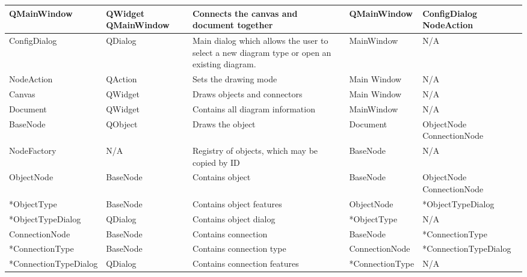 \documentclass[twoside,letterpaper]{article}
\begin{document}
{\begin{landscape}
\begin{flushleft}
\begin{supertabular}{|m{1.65in}|m{1.0in}|m{3.0in}|m{1.65in}|m{1.65in}|}
    QMainWindow 
  & QWidget \newline QMainWindow 
  & Connects the canvas and document together 
  & QMainWindow
  & ConfigDialog \newline NodeAction
\\\hline

    ConfigDialog 
  & QDialog
  & Main dialog which allows the user to select a new diagram type or open an existing diagram. 
  & MainWindow
  & N/A
\\\hline

    NodeAction 
  & QAction
  & Sets the drawing mode
  & Main Window 
  & N/A
\\\hline

    Canvas
  & QWidget
  & Draws objects and connectors 
  & Main Window 
  & N/A
\\\hline

    Document
  & QWidget 
  & Contains all diagram information
  & MainWindow 
  & N/A
\\\hline

    BaseNode
  & QObject
  & Draws the object
  & Document
  & ObjectNode \newline ConnectionNode
\\\hline

    NodeFactory
  & N/A
  & Registry of objects, which may be copied by ID
  & BaseNode
  & N/A
\\\hline

    ObjectNode
  & BaseNode
  & Contains object
  & BaseNode
  & ObjectNode \newline ConnectionNode
\\\hline

    *ObjectType
  & BaseNode
  & Contains object features
  & ObjectNode
  & *ObjectTypeDialog
\\\hline

    *ObjectTypeDialog
  & QDialog
  & Contains object dialog
  & *ObjectType
  & N/A
\\\hline

    ConnectionNode
  & BaseNode
  & Contains connection
  & BaseNode
  & *ConnectionType
\\\hline

    *ConnectionType 
  & BaseNode
  & Contains connection type
  & ConnectionNode
  & *ConnectionTypeDialog
\\\hline

    *ConnectionTypeDialog
  & QDialog
  & Contains connection features
  & *ConnectionType
  & N/A
\\\hline


\end{supertabular}
\end{flushleft}
\end{landscape}}
\end{document}

